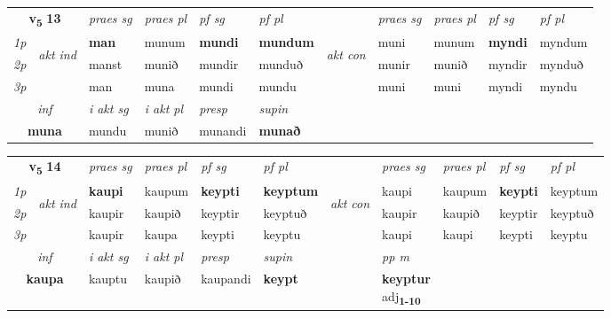 \noindent
\begin{tabular}{lllllllllll} \toprule
\multicolumn{2}{c}{\textbf{v{\textsubscript{5}}} \Large{\textbf{13}}}  &  \textit{praes sg}  & \textit{praes pl}  &\textit{ pf sg} & \textit{pf pl} &  &  \textit{praes sg}  & \textit{praes pl}  & \textit{pf sg} & \textit{pf pl } \\*
	\cmidrule{3-6} \cmidrule{8-11}
 {\textit{1p}} & \multirow{3}{*}{\begin{turn}{90}\textit{akt ind}\end{turn}} & \textbf{man} & munum & \textbf{mundi} & \textbf{mundum} & \multirow{3}{*}{\begin{turn}{90}\textit{akt con}\end{turn}} &muni & munum & \textbf{myndi} & myndum\\*
 {\textit{2p}} &  &  manst  & munið & mundir & munduð & & munir & munið & myndir & mynduð \\*
{\textit{3p}} &  & man & muna & mundi & mundu & & muni & muni& myndi & myndu \\*
\cmidrule{3-6} \cmidrule{8-11}

   \multicolumn{2}{c}{\textit{inf}}  & \textit{i akt sg} & \textit{i akt pl}   & \textit{presp} & \textit{supin}   \\*
  \multicolumn{2}{c}{\textbf{muna}} & mundu  & munið   & munandi &  \textbf{munað}   \\*
\end{tabular}

\noindent
\begin{tabular}{lllllllllll} \toprule
\multicolumn{2}{c}{\textbf{v{\textsubscript{5}}} \Large{\textbf{14}}}  &  \textit{praes sg}  & \textit{praes pl}  &\textit{ pf sg} & \textit{pf pl} &  &  \textit{praes sg}  & \textit{praes pl}  & \textit{pf sg} & \textit{pf pl } \\*
	\cmidrule{3-6} \cmidrule{8-11}
 {\textit{1p}} & \multirow{3}{*}{\begin{turn}{90}\textit{akt ind}\end{turn}} & \textbf{kaupi} & kaupum & \textbf{keypti} & \textbf{keyptum} & \multirow{3}{*}{\begin{turn}{90}\textit{akt con}\end{turn}} &kaupi & kaupum & \textbf{keypti} & keyptum\\*
 {\textit{2p}} &  &  kaupir  & kaupið & keyptir & keyptuð & & kaupir & kaupið & keyptir & keyptuð \\*
{\textit{3p}} &  & kaupir & kaupa & keypti & keyptu & & kaupi & kaupi& keypti & keyptu \\*
\cmidrule{3-6} \cmidrule{8-11}

   \multicolumn{2}{c}{\textit{inf}}  & \textit{i akt sg} & \textit{i akt pl}   & \textit{presp} & \textit{supin}  && \textit{pp m} \\*
  \multicolumn{2}{c}{\textbf{kaupa}} & kauptu  & kaupið   & kaupandi &  \textbf{keypt}  && \specialcell{\textbf{keyptur} \\ adj\textbf{\textsubscript{1-10}}} \\*
\end{tabular}

